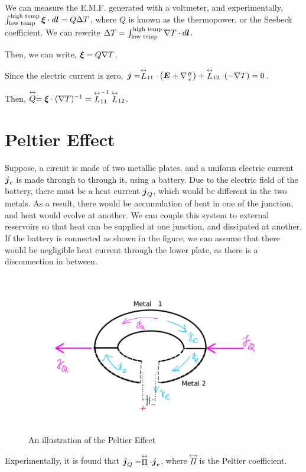 \documentclass{report}
\renewcommand\vec[1]{\ensuremath\boldsymbol{#1}} %
\begin{document}
We can measure the E.M.F. generated with a voltmeter, and experimentally, $\int_{\text{low temp}}^{\text{high temp}} \vec{\xi} \cdot d \vec{l} = Q \Delta T$, where $Q$ is known as the thermopower, or the Seebeck coefficient. We can rewrite $\Delta T = \int_{\text{low temp}}^{\text{high temp}} \nabla T \cdot d\vec{l}$.

Then, we can write, $\vec{\xi} = Q \nabla T$.

Since the electric current is zero, $\vec{j}=  \stackrel{\leftrightarrow}{L}_{11} \cdot \left(\vec{E} + \nabla \frac{\mu}{e}\right) + \stackrel{\leftrightarrow}{L}_{12} \cdot (-\nabla{T}) = 0$.

Then, $\stackrel{\leftrightarrow}{Q} = \vec{\xi} \cdot (\nabla T)^{-1} = {\stackrel{\leftrightarrow}{L}}^{-1}_{11} \stackrel{\leftrightarrow}{L}_{12}$.

\section{Peltier Effect}
Suppose, a circuit is made of two metallic plates, and a uniform electric current $\vec{j}_e$ is made through to through it, using a battery. Due to the electric field of the battery, there must be a heat current $\vec{j}_Q$, which would be different in the two metals. As a result, there would be accumulation of heat in one of the junction, and heat would evolve at another. We can couple this system to external reservoirs so that heat can be supplied at one junction, and dissipated at another. If the battery is connected as shown in the figure, we can assume that there would be negligible heat current through the lower plate, as there is a disconnection in between.
\begin{figure}[h!]
	\centering
	\includegraphics[width=0.7\linewidth]{peltier}
	\caption{An illustration of the Peltier Effect}
	\label{fig:peltier}
\end{figure}

Experimentally, it is found that $\vec{j}_Q = \stackrel{\leftrightarrow}{\Pi} \cdot \vec{j}_e$, where $\stackrel{\leftrightarrow}{\Pi}$ is the Peltier coefficient.
\end{document}
